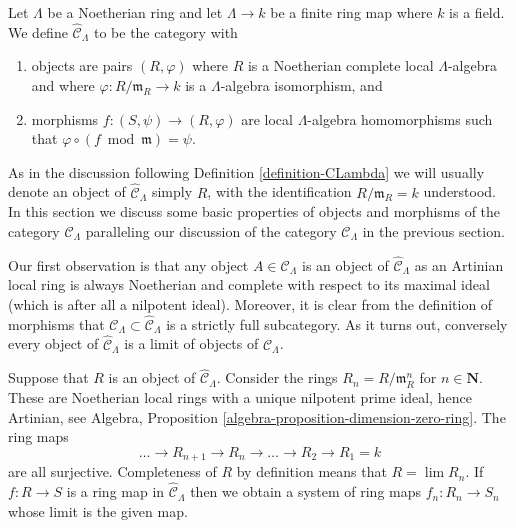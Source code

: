 \begin{definition}
\label{definition-completion-CLambda}
Let $\Lambda$ be a Noetherian ring and let $\Lambda \to k$ be a finite
ring map where $k$ is a field. We define {\it $\widehat{\mathcal{C}}_\Lambda$}
to be the category with
\begin{enumerate}
\item objects are pairs $(R, \varphi)$ where $R$ is a Noetherian complete
local $\Lambda$-algebra and where $\varphi : R/\mathfrak m_R \to k$ is a
$\Lambda$-algebra isomorphism, and
\item morphisms $f : (S, \psi) \to (R, \varphi)$ are local $\Lambda$-algebra
homomorphisms such that $\varphi \circ (f \bmod \mathfrak m) = \psi$.
\end{enumerate}
\end{definition}

\noindent
As in the discussion following
Definition \ref{definition-CLambda}
we will usually denote an object of $\widehat{\mathcal{C}}_\Lambda$
simply $R$, with the identification $R/\mathfrak m_R = k$ understood.
In this section we discuss some basic properties of objects and morphisms
of the category $\widehat{\mathcal{C}}_\Lambda$ paralleling our discussion of
the category $\mathcal{C}_\Lambda$ in the previous section.

\medskip\noindent
Our first observation is that any object $A \in \mathcal{C}_\Lambda$
is an object of $\widehat{\mathcal{C}}_\Lambda$ as an Artinian local
ring is always Noetherian and complete with respect to its maximal ideal
(which is after all a nilpotent ideal). Moreover, it is clear from the
definition of morphisms that
$\mathcal{C}_\Lambda \subset \widehat{\mathcal{C}}_\Lambda$
is a strictly full subcategory. As it turns out, conversely every object of
$\widehat{\mathcal{C}}_\Lambda$ is a limit of objects of
$\mathcal{C}_\Lambda$.

\medskip\noindent
Suppose that $R$ is an object of $\widehat{\mathcal{C}}_\Lambda$.
Consider the rings $R_n = R/\mathfrak m_R^n$ for $n \in \mathbf{N}$.
These are Noetherian local rings with a unique nilpotent prime ideal, hence
Artinian, see
Algebra, Proposition \ref{algebra-proposition-dimension-zero-ring}.
The ring maps
$$
\ldots \to R_{n + 1} \to R_n \to \ldots \to R_2 \to R_1 = k
$$
are all surjective. Completeness of $R$ by definition means
that $R = \lim R_n$. If $f : R \to S$ is a ring map in
$\widehat{\mathcal{C}}_\Lambda$ then we obtain a system of ring maps
$f_n : R_n \to S_n$ whose limit is the given map.

